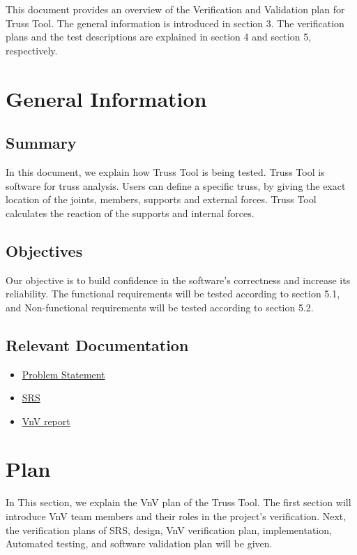 \documentclass[12pt, titlepage]{article}
\begin{document}
\newpage
This document provides an overview of the Verification and Validation
 plan for Truss Tool. The general information is introduced in section 3. The verification plans and the test descriptions are explained in section 4 and section 5, respectively.
\section{General Information}


\subsection{Summary}

In this document, we explain how Truss Tool is being tested. Truss Tool is software for truss analysis. Users can define a specific truss, by giving the exact location of the joints, members, supports and external forces.  Truss Tool calculates the reaction of the supports and internal forces. 

\subsection{Objectives}

Our objective is to build confidence in the software's correctness and increase its reliability. The functional requirements will be tested according to section 5.1, and Non-functional requirements will be tested according to section 5.2.

\subsection{Relevant Documentation}
\begin{itemize}
	\item 
	\href{https://github.com/Maryamvalian/project741/blob/main/docs/ProblemStatementAndGoals/ProblemStatement.pdf}{Problem
	 Statement}
	\item 
	\href{https://github.com/Maryamvalian/project741/blob/main/docs/SRS/SRS.pdf}{SRS} 
	\item \href{https://github.com/Maryamvalian/project741/blob/main/docs/VnVReport/VnVReport.pdf}{VnV
	 report}
\end{itemize}

\section{Plan}
In This section, we explain the VnV plan of the Truss Tool. The first section will introduce VnV team members and their roles in the project's verification. Next, the verification plans of SRS, design, VnV verification plan, implementation, Automated testing, and software validation plan will be given. 
\end{document}
